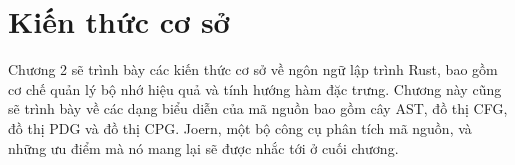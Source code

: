 \chapter{Kiến thức cơ sở}
\label{chap:background}

Chương 2 sẽ trình bày các kiến thức cơ sở về ngôn ngữ lập trình Rust, bao gồm cơ chế quản lý bộ nhớ hiệu quả và tính hướng hàm đặc trưng.
Chương này cũng sẽ trình bày về các dạng biểu diễn của mã nguồn bao gồm cây AST, đồ thị CFG, đồ thị PDG và đồ thị CPG.
Joern, một bộ công cụ phân tích mã nguồn, và những ưu điểm mà nó mang lại sẽ được nhắc tới ở cuối chương.




